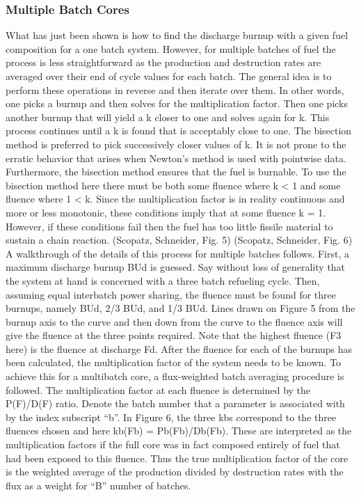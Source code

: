 \subsubsection{Multiple Batch Cores}
\label{1g_sec:batch_ave}
What has just been shown is how to find the discharge burnup with a given fuel composition for a one batch system.  However, for multiple batches of fuel the process is less straightforward as the production and destruction rates are averaged over their end of cycle values for each batch.  The general idea is to perform these operations in reverse and then iterate over them.  In other words, one picks a burnup and then solves for the multiplication factor.  Then one picks another burnup that will yield a k closer to one and solves again for k.  This process continues until a k is found that is acceptably close to one.  
The bisection method is preferred to pick successively closer values of k.  It is not prone to the erratic behavior that arises when Newton’s method is used with pointwise data.   Furthermore, the bisection method ensures that the fuel is burnable.  To use the bisection method here there must be both some fluence where k < 1 and some fluence where 1 < k.  Since the multiplication factor is in reality continuous and more or less monotonic, these conditions imply that at some fluence k = 1.  However, if these conditions fail then the fuel has too little fissile material to sustain a chain reaction. 
(Scopatz, Schneider, Fig. 5) 
(Scopatz, Schneider, Fig. 6)
A walkthrough of the details of this process for multiple batches follows.  First, a maximum discharge burnup BUd is guessed.  Say without loss of generality that the system at hand is concerned with a three batch refueling cycle.  Then, assuming equal interbatch power sharing, the fluence must be found for three burnups, namely BUd, 2/3 BUd, and 1/3 BUd.   Lines drawn on Figure 5 from the burnup axis to the curve and then down from the curve to the fluence axis will give the fluence at the three points required.  Note that the highest fluence (F3 here) is the fluence at discharge Fd.  After the fluence for each of the burnups has been calculated, the multiplication factor of the system needs to be known. 
To achieve this for a multibatch core, a flux-weighted batch averaging procedure is followed.  The multiplication factor at each fluence is determined by the P(F)/D(F) ratio.  Denote the batch number that a parameter is associated with by the index subscript “b”.  In Figure 6, the three kbs correspond to the three fluences chosen and here kb(Fb) = Pb(Fb)/Db(Fb).  These are interpreted as the multiplication factors if the full core was in fact composed entirely of fuel that had been exposed to this fluence. Thus the true multiplication factor of the core is the weighted average of the production divided by destruction rates with the flux as a weight for “B” number of batches.

